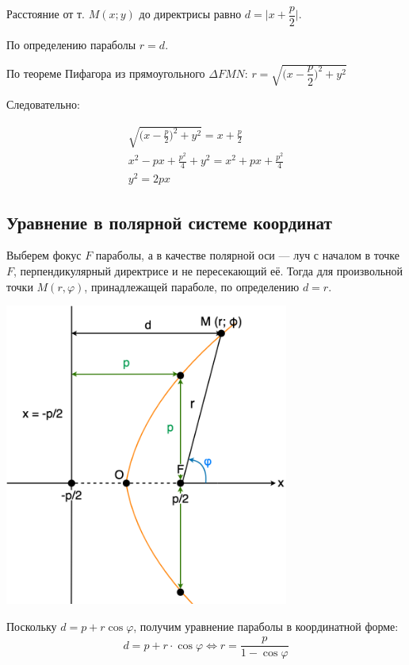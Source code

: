 \documentclass[a4paper,12pt]{extbook}
\theoremstyle{named}
\theoremstyle{named}
\begin{document}
Расстояние от т. \(M(x;y)\) до директрисы равно \(d = \Big| x + \dfrac{p}{2} \Big| \).

По определению параболы \(r = d\).

По теореме Пифагора из прямоугольного \(\Delta FMN\): \(r=\sqrt{\Big(x - \dfrac{p}{2}\Big)^2 + y^2}\)

Следовательно:

\begin{gather*}
    \sqrt{\Big(x - \frac{p}{2}\Big)^2 + y^2} = x + \frac{p}{2} \\
    x^2 - px + \frac{p^2}{4} + y^2 = x^2 + px + \frac{p^2}{4} \\
    y^2 = 2px
\end{gather*}

\subsection*{Уравнение в полярной системе координат}

Выберем фокус \(F\) параболы, а в качестве полярной оси — луч с началом в точке \(F\), перпендикулярный директрисе и не пересекающий её.
Тогда для произвольной точки \(M(r, \varphi)\), принадлежащей параболе, по определению \(d = r\).

\begin{center}
    \includegraphics[width=0.7\textwidth]{parabola2.png}
\end{center}

Поскольку \(d = p + r\cos{\varphi}\), получим уравнение параболы в координатной форме:
\begin{gather*}
    d = p + r \cdot \cos{\varphi}  \iff r = \dfrac{p}{1 - \cos{\varphi}}
\end{gather*}
\end{document}

